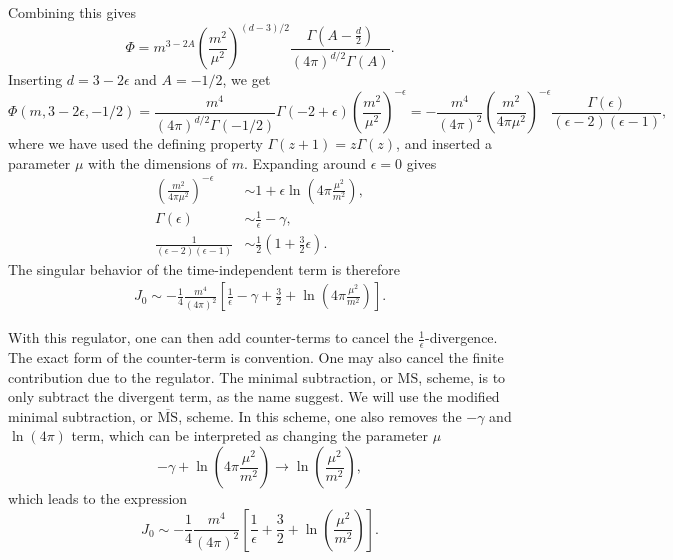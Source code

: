 Combining this gives
\begin{equation}
    \Phi = m^{3 - 2A}
    \left(\frac{m^2}{\mu^2}\right)^{(d-3)/2} 
    \frac{
        \Gamma \left(A - \frac{d}{2} \right) 
    }
    {
        (4 \pi)^{d / 2}\Gamma(A)
    }.
\end{equation}
Inserting $d = 3 - 2\epsilon$ and $A = -1/2$, we get
\begin{equation}
    \Phi(m, 3 - 2\epsilon, -1/2)
    =
    \frac{m^4}{(4 \pi)^{d/2}\Gamma(-1/2)} \Gamma(-2 + \epsilon) \left(\frac{m^2}{\mu^2}\right)^{-\epsilon}
    =
    - \frac{m^4}{(4 \pi)^{2}}
    \left(\frac{m^2}{4 \pi \mu^2}\right)^{- \epsilon}
    \frac{\Gamma(\epsilon)}{(\epsilon - 2)(\epsilon - 1)},
\end{equation}
where we have used the defining property $\Gamma(z + 1) = z\Gamma(z)$, and inserted a parameter $\mu$ with the dimensions of $m$.
Expanding around $\epsilon = 0$ gives
\begin{align}
    \left(\frac{m^2}{4 \pi \mu^2}\right)^{- \epsilon}
    &\sim 1 + \epsilon \ln\left(4 \pi \frac{\mu^2}{m^2}\right),\\
    \Gamma(\epsilon) 
    & \sim \frac{1}{\epsilon} - \gamma, \\
    \frac{1}{(\epsilon - 2)(\epsilon - 1)}
    &\sim \frac{1}{2}\left(1 + \frac{3}{2} \epsilon\right).
\end{align}
The singular behavior of the time-independent term is therefore
\begin{align}
    J_0 \sim
    - \frac{1}{4}\frac{m^4}{(4 \pi)^2}
    \left[
        \frac{1}{\epsilon} 
        - \gamma + \frac{3}{2}
        + \ln\left(4 \pi \frac{\mu^2}{m^2}\right)
    \right].
\end{align}

With this regulator, one can then add counter-terms to cancel the $\frac{1}{\epsilon}$-divergence.
The exact form of the counter-term is convention.
One may also cancel the finite contribution due to the regulator.
The minimal subtraction, or $\mathrm{MS}$, scheme, is to only subtract the divergent term, as the name suggest.
We will use the modified minimal subtraction, or $\overline{ \mathrm{MS}}$, scheme.
In this scheme, one also removes the $-\gamma$ and $\ln(4 \pi)$ term,
which can be interpreted as changing the parameter $\mu$
\begin{equation}
    -\gamma + \ln(4\pi \frac{\mu^2}{m^2}) \rightarrow \ln(\frac{\mu^2}{m^2}),
\end{equation}
which leads to the expression
\begin{equation}
    J_0 \sim
    - \frac{1}{4}\frac{m^4}{(4 \pi)^2}
    \left[
        \frac{1}{\epsilon} 
        + \frac{3}{2}
        + \ln\left(\frac{\mu^2}{m^2}\right)
    \right].
\end{equation}

